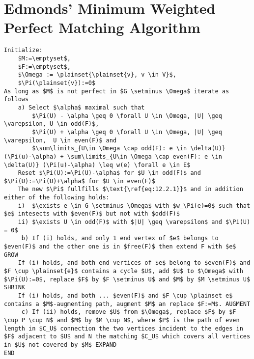 \section*{Edmonds' Minimum Weighted Perfect Matching Algorithm}
\begin{lstlisting}
Initialize:
	$M:=\emptyset$, 
	$F:=\emptyset$,
	$\Omega := \plainset{\plainset{v}, v \in V}$,
	$\Pi(\plainset{v}):=0$
As long as $M$ is not perfect in $G \setminus \Omega$ iterate as follows
    a) Select $\alpha$ maximal such that 
		$\Pi(U) - \alpha \geq 0 \forall U \in \Omega, |U| \geq \varepsilon, U \in odd(F)$,
		$\Pi(U) + \alpha \geq 0 \forall U \in \Omega, |U| \geq \varepsilon,  U \in even(F)$ and
		$\sum\limits_{U\in \Omega \cap odd(F): e \in \delta(U)} (\Pi(u)-\alpha) + \sum\limits_{U\in \Omega \cap even(F): e \in \delta(U)} (\Pi(u)-\alpha) \leq w(e) \forall e \in E$
	Reset $\Pi(U):=\Pi(U)-\alpha$ for $U \in odd(F)$ and $\Pi(U):=\Pi(U)+\alpha$ for $U \in even(F)$
	The new $\Pi$ fullfills $\text{\ref{eq:12.2.1}}$ and in addition either of the following holds:
	i)  $\exists e \in G \setminus \Omega$ with $w_\Pi(e)=0$ such that $e$ intesects with $even(F)$ but not with $odd(F)$
	ii) $\exists U \in odd(F)$ with $|U| \geq \varepsilon$ and $\Pi(U) = 0$
     b) If (i) holds, and only 1 end vertex of $e$ belongs to $even(F)$ and the other one is in $free(F)$ then extend F with $e$ GROW
	If (i) holds, and both end vertices of $e$ belong to $even(F)$ and $F \cup \plainset{e}$ contains a cycle $U$, add $U$ to $\Omega$ with $\Pi(U):=0$, replace $F$ by $F \setminus U$ and $M$ by $M \setminus U$ SHRINK
	If (i) holds, and both ... $even(F)$ and $F \cup \plainset e$ contains a $M$-augmenting path, augment $M$ an replace $F:=M$. AUGMENT
     c) If (ii) holds, remove $U$ from $\Omega$, replace $F$ by $F \cup P \cup N$ and $M$ by $M \cup N$, where $P$ is the path of even length in $C_U$ connection the two vertices incident to the edges in $F$ adjacent to $U$ and N the matching $C_U$ which covers all vertices in $U$ not covered by $M$ EXPAND
END
\end{lstlisting}
